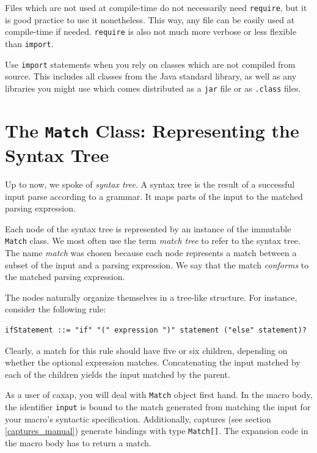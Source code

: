 Files which are not used at compile-time do not necessarily need
\texttt{require}, but it is good practice to use it nonetheless. This way, any
file can be easily used at compile-time if needed. \texttt{require} is also not
much more verbose or less flexible than \texttt{import}.

Use \texttt{import} statements when you rely on classes which are not compiled
from source. This includes all classes from the Java standard library, as well
as any libraries you might use which comes distributed as a \texttt{jar} file or
as \texttt{.class} files.

\section{The \texttt{Match} Class: Representing the Syntax Tree}
\label{match_class}

Up to now, we spoke of \emph{syntax tree}. A syntax tree is the result of a
successful input parse according to a grammar. It maps parts of the input to the
matched parsing expression.

Each node of the syntax tree is represented by an instance of the immutable
\texttt{Match} class. We most often use the term \emph{match tree} to refer to
the syntax tree. The name \emph{match} was chosen because each node represents a
match between a subset of the input and a parsing expression. We say that the
match \emph{conforms} to the matched parsing expression.

The nodes naturally organize themselves in a tree-like structure. For instance,
consider the following rule:

\begin{lstlisting}
ifStatement ::= "if" "(" expression ")" statement ("else" statement)?
\end{lstlisting}

Clearly, a match for this rule should have five or six children, depending on
whether the optional expression matches. Concatenating the input matched by each
of the children yields the input matched by the parent.

As a user of caxap, you will deal with \texttt{Match} object first hand. In the
macro body, the identifier \texttt{input} is bound to the match generated from
matching the input for your macro's syntactic specification. Additionally,
captures (see section \ref{captures_manual}) generate bindings with type
\texttt{Match[]}. The expansion code in the macro body has to return a match.

